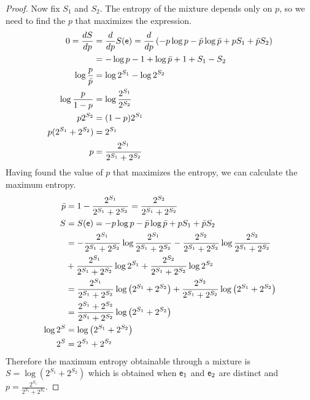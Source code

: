 \begin{proof}
	Now fix $S_1$ and $S_2$. The entropy of the mixture depends only on $p$, so we need to find the $p$ that maximizes the expression.
	\begin{equation}
		\begin{aligned}
			0 = \frac{dS}{dp} &= \frac{d}{dp} S(\mathsf{e}) =\frac{d}{dp} \left( - p \log p - \bar{p} \log \bar{p} + p S_1 + \bar{p} S_2 \right) \\
			&= - \log p - 1 + \log \bar{p} + 1 + S_1 - S_2 \\
			\log \frac{p}{\bar{p}} &= \log 2^{S_1} - \log 2^{S_2} \\
			\log \frac{p}{1-p} &= \log \frac{2^{S_1}}{2^{S_2}}  \\
			p 2^{S_2} &= (1-p) 2^{S_1}  \\
			p (2^{S_1} + 2^{S_2}) &= 2^{S_1}  \\
			p &= \frac{2^{S_1}}{2^{S_1} + 2^{S_2}}  \\
		\end{aligned}
	\end{equation}
	Having found the value of $p$ that maximizes the entropy, we can calculate the maximum entropy.
	\begin{equation}
	\begin{aligned}
		\bar{p} &= 1- \frac{2^{S_1}}{2^{S_1} + 2^{S_2}} = \frac{2^{S_2}}{2^{S_1} + 2^{S_2}} \\
		S &= S(\mathsf{e}) = - p \log p - \bar{p} \log \bar{p} + p S_1 + \bar{p} S_2  \\
		&= - \frac{2^{S_1}}{2^{S_1} + 2^{S_2}} \log \frac{2^{S_1}}{2^{S_1} + 2^{S_2}} - \frac{2^{S_2}}{2^{S_1} + 2^{S_2}} \log \frac{2^{S_2}}{2^{S_1} + 2^{S_2}} \\
		&+ \frac{2^{S_1}}{2^{S_1} + 2^{S_2}} \log 2^{S_1} + \frac{2^{S_2}}{2^{S_1} + 2^{S_2}} \log 2^{S_2} \\
		&= \frac{2^{S_1}}{2^{S_1} + 2^{S_2}} \log \left( 2^{S_1} + 2^{S_2} \right) + \frac{2^{S_2}}{2^{S_1} + 2^{S_2}} \log \left( 2^{S_1} + 2^{S_2} \right) \\
		&= \frac{2^{S_1} + 2^{S_2}}{2^{S_1} + 2^{S_2}} \log \left( 2^{S_1} + 2^{S_2} \right) \\
		\log 2^S &= \log \left( 2^{S_1} + 2^{S_2} \right) \\
		2^S &=  2^{S_1} + 2^{S_2}  \\
	\end{aligned}
	\end{equation}
	Therefore the maximum entropy obtainable through a mixture is $S = \log (2^{S_1} + 2^{S_2})$ which is obtained when $\mathsf{e}_1$ and $\mathsf{e}_2$ are distinct and $p = \frac{2^{S_1}}{2^{S_1} + 2^{S_2}}$.
\end{proof}

